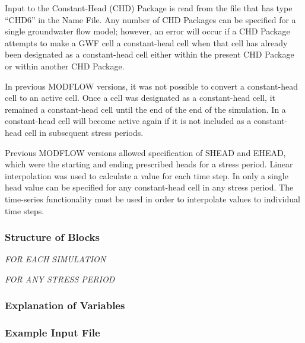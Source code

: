 
Input to the Constant-Head (CHD) Package is read from the file that has type ``CHD6'' in the Name File.  Any number of CHD Packages can be specified for a single groundwater flow model; however, an error will occur if a CHD Package attempts to make a GWF cell a constant-head cell when that cell has already been designated as a constant-head cell either within the present CHD Package or within another CHD Package.

In previous MODFLOW versions, it was not possible to convert a constant-head cell to an active cell.  Once a cell was designated as a constant-head cell, it remained a constant-head cell until the end of the end of the simulation.  In \mf a constant-head cell will become active again if it is not included as a constant-head cell in subsequent stress periods.

Previous MODFLOW versions allowed specification of SHEAD and EHEAD, which were the starting and ending prescribed heads for a stress period.  Linear interpolation was used to calculate a value for each time step.  In \mf only a single head value can be specified for any constant-head cell in any stress period.  The time-series functionality must be used in order to interpolate values to individual time steps.  

\vspace{5mm}
\subsubsection{Structure of Blocks}
\vspace{5mm}

\noindent \textit{FOR EACH SIMULATION}


\vspace{5mm}
\noindent \textit{FOR ANY STRESS PERIOD}

\packageperioddescription

\vspace{5mm}
\subsubsection{Explanation of Variables}
\begin{description}

\end{description}

\vspace{5mm}
\subsubsection{Example Input File}


